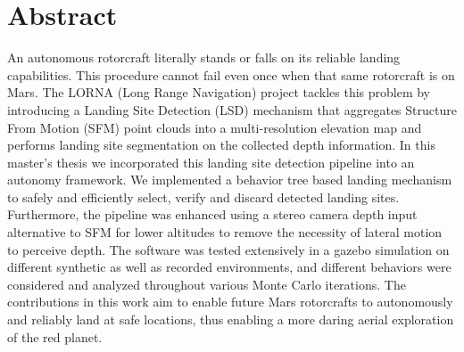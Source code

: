 \chapter*{Abstract}

An autonomous rotorcraft literally stands or falls on its reliable landing capabilities. This procedure cannot fail even once when that same rotorcraft is on Mars. The LORNA (Long Range Navigation) project tackles this problem by introducing a Landing Site Detection (LSD) mechanism that aggregates Structure From Motion (SFM) point clouds into a multi-resolution elevation map and performs landing site segmentation on the collected depth information. In this master's thesis we incorporated this landing site detection pipeline into an autonomy framework. We implemented a behavior tree based landing mechanism to safely and efficiently select, verify and discard detected landing sites. Furthermore, the pipeline was enhanced using a stereo camera depth input alternative to SFM for lower altitudes to remove the necessity of lateral motion to perceive depth. The software was tested extensively in a gazebo simulation on different synthetic as well as recorded environments, and different behaviors were considered and analyzed throughout various Monte Carlo iterations. The contributions in this work aim to enable future Mars rotorcrafts to autonomously and reliably land at safe locations, thus enabling a more daring aerial exploration of the red planet.
